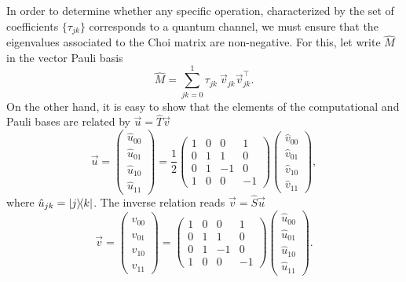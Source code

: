 In order to determine whether any specific operation, characterized by the set of coefficients $\{\tau_{jk}\}$ corresponds to a quantum channel, we must ensure that the eigenvalues associated to the Choi matrix are non-negative. For this, let write $\hat{M}$ in the vector Pauli basis
%
\begin{equation}
 \hat{M}=\sum_{jk=0}^1\tau_{jk}~\vec{v}_{jk}\vec{v}_{jk}^\intercal.
 \label{EQA1}
\end{equation}
%
On the other hand, it is easy to show that the elements of the computational and Pauli bases are related by $\vec{u}=\hat{T}\vec{v}$
\begin{equation}
\vec{u}=\begin{pmatrix}
\hat{u}_{00} \\ \hat{u}_{01} \\ \hat{u}_{10} \\ \hat{u}_{11}
\end{pmatrix}=\frac{1}{2}\begin{pmatrix}
1 & 0 & 0 & 1\\
0 & 1 & 1 & 0\\
0 & 1 & -1 & 0\\
1 & 0 & 0 & -1
\end{pmatrix} \begin{pmatrix}
\hat{v}_{00} \\ \hat{v}_{01} \\ \hat{v}_{10} \\ \hat{v}_{11}
\end{pmatrix},
\end{equation}
% 
where $\hat{u}_{jk}=\dyad{j}{k}$. The inverse relation reads $\vec{v}=\hat{S}\vec{u}$
\begin{equation}
\vec{v}=\begin{pmatrix}
\hat{v}_{00} \\ \hat{v}_{01} \\ \hat{v}_{10} \\ \hat{v}_{11}
\end{pmatrix}=\begin{pmatrix}
1 & 0 & 0 & 1\\
0 & 1 & 1 & 0\\
0 & 1 & -1 & 0\\
1 & 0 & 0 & -1
\end{pmatrix} \begin{pmatrix}
\hat{u}_{00} \\ \hat{u}_{01} \\ \hat{u}_{10} \\ \hat{u}_{11}
\end{pmatrix}.
\end{equation}
